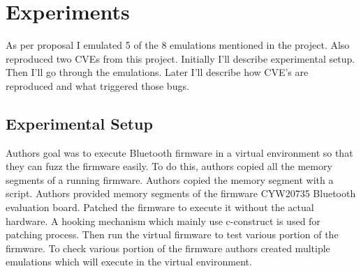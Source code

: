 \documentclass[letterpaper,11pt]{article}
\begin{document}
\section{Experiments}
As per proposal I emulated 5 of the 8 emulations mentioned in the project. Also reproduced two CVEs from this project. Initially I'll describe experimental setup. Then I'll go through the emulations. Later I'll describe how CVE's are reproduced and what triggered those bugs.
\subsection{Experimental Setup}
Authors goal was to execute Bluetooth firmware in a virtual environment so that they can fuzz the firmware easily. To do this, authors copied all the memory segments of a running firmware. Authors copied the memory segment with a script. Authors provided memory segments of the firmware CYW20735 Bluetooth evaluation board. Patched the firmware to execute it without the actual hardware. A hooking mechanism which mainly use c-construct is used for patching process. Then run the virtual firmware to test various portion of the firmware. To check various portion of the firmware authors created multiple emulations which will execute in the virtual environment.
\end{document}
